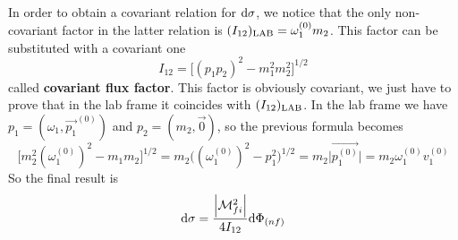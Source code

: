 \documentclass[TheoreticalPhy_ModB.tex]{subfiles}
\begin{document}
In order to obtain a covariant relation for $\textup{d} \sigma$, we notice that the only non-covariant factor in the latter relation is $(I_{12})_{\textup{LAB}} = \omega_1^{(0)} m_2$. This factor can be substituted with a covariant one
\[
I_{12} = \bigl[ (p_1 p_2)^2 - m_1^2 m_2^2 \bigr]^{1/2}
\]
called \textbf{covariant flux factor}. This factor is obviously covariant, we just have to prove that in the lab frame it coincides with $(I_{12})_{\textup{LAB}}$.
In the lab frame we have $p_1 = (\omega_1, \vec{p_1}^{(0)})$ and $p_2 = (m_2, \vec{0})$, so the previous formula becomes
\[
\bigl[ m_2^2 (\omega_1^{(0)})^2 - m_1 m_2 \bigr]^{1/2} = m_2 \bigl( (\omega_1^{(0)})^2 - p_1^2 \bigr)^{1/2} = m_2 \big\vert{\vec{p_1^{(0)}}}\big\vert
	= m_2 \omega_1^{(0)} v_1^{(0)}
\]
So the final result is
\[
\textup{d} \sigma = \frac{\abs{\mathcal{M}_{fi}^2}}{4 I_{12}} \textup{d} \Phi_{(nf)}
\]
\end{document}

